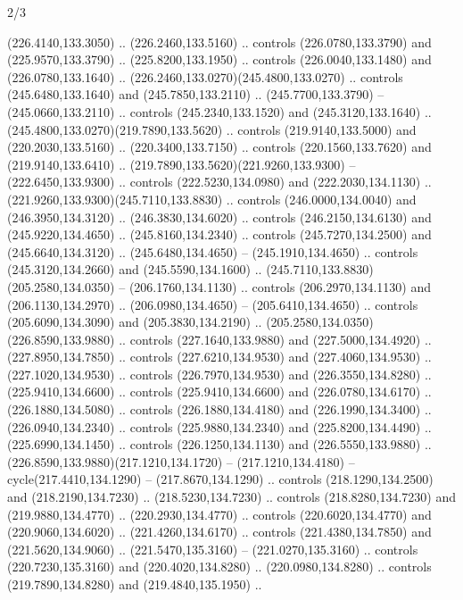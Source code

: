 \begin{flagdescription}{2/3}
\begin{scope}[xshift=0.5\flaglength,yshift=0.5\flagwidth,scale=\flagwidth/259.2]
\begin{scope}[y=0.8pt, x=0.8pt, yscale=-1,shift={(-243,-162)}]
      (226.4140,133.3050) .. (226.2460,133.5160) .. controls (226.0780,133.3790) and
      (225.9570,133.3790) .. (225.8200,133.1950) .. controls (226.0040,133.1480) and
      (226.0780,133.1640) .. (226.2460,133.0270)(245.4800,133.0270) .. controls
      (245.6480,133.1640) and (245.7850,133.2110) .. (245.7700,133.3790) --
      (245.0660,133.2110) .. controls (245.2340,133.1520) and (245.3120,133.1640) ..
      (245.4800,133.0270)(219.7890,133.5620) .. controls (219.9140,133.5000) and
      (220.2030,133.5160) .. (220.3400,133.7150) .. controls (220.1560,133.7620) and
      (219.9140,133.6410) .. (219.7890,133.5620)(221.9260,133.9300) --
      (222.6450,133.9300) .. controls (222.5230,134.0980) and (222.2030,134.1130) ..
      (221.9260,133.9300)(245.7110,133.8830) .. controls (246.0000,134.0040) and
      (246.3950,134.3120) .. (246.3830,134.6020) .. controls (246.2150,134.6130) and
      (245.9220,134.4650) .. (245.8160,134.2340) .. controls (245.7270,134.2500) and
      (245.6640,134.3120) .. (245.6480,134.4650) -- (245.1910,134.4650) .. controls
      (245.3120,134.2660) and (245.5590,134.1600) ..
      (245.7110,133.8830)(205.2580,134.0350) -- (206.1760,134.1130) .. controls
      (206.2970,134.1130) and (206.1130,134.2970) .. (206.0980,134.4650) --
      (205.6410,134.4650) .. controls (205.6090,134.3090) and (205.3830,134.2190) ..
      (205.2580,134.0350)(226.8590,133.9880) .. controls (227.1640,133.9880) and
      (227.5000,134.4920) .. (227.8950,134.7850) .. controls (227.6210,134.9530) and
      (227.4060,134.9530) .. (227.1020,134.9530) .. controls (226.7970,134.9530) and
      (226.3550,134.8280) .. (225.9410,134.6600) .. controls (225.9410,134.6600) and
      (226.0780,134.6170) .. (226.1880,134.5080) .. controls (226.1880,134.4180) and
      (226.1990,134.3400) .. (226.0940,134.2340) .. controls (225.9880,134.2340) and
      (225.8200,134.4490) .. (225.6990,134.1450) .. controls (226.1250,134.1130) and
      (226.5550,133.9880) .. (226.8590,133.9880)(217.1210,134.1720) --
      (217.1210,134.4180) -- cycle(217.4410,134.1290) -- (217.8670,134.1290) ..
      controls (218.1290,134.2500) and (218.2190,134.7230) .. (218.5230,134.7230) ..
      controls (218.8280,134.7230) and (219.9880,134.4770) .. (220.2930,134.4770) ..
      controls (220.6020,134.4770) and (220.9060,134.6020) .. (221.4260,134.6170) ..
      controls (221.4380,134.7850) and (221.5620,134.9060) .. (221.5470,135.3160) --
      (221.0270,135.3160) .. controls (220.7230,135.3160) and (220.4020,134.8280) ..
      (220.0980,134.8280) .. controls (219.7890,134.8280) and (219.4840,135.1950) ..

\end{scope}
\end{scope}
\end{flagdescription}
